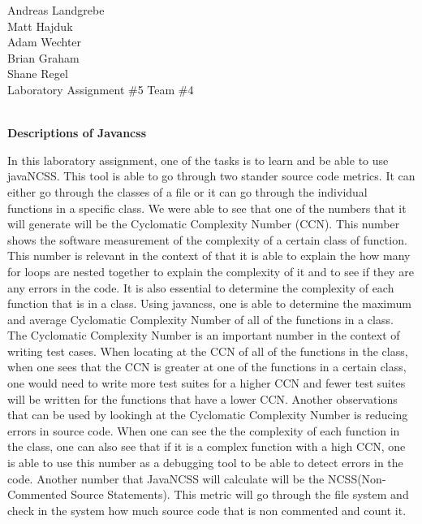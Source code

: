 \documentclass{article}
\begin{document}
\noindent
Andreas Landgrebe
\\
Matt Hajduk
\\
Adam Wechter
\\
Brian Graham
\\
Shane Regel
\\
Laboratory Assignment \#5 Team \#4 
\\
\\
\begin{center}
\textbf{Descriptions of Javancss}
\end{center}
In this laboratory assignment, one of the tasks is to learn and be able to use javaNCSS. This tool is able to go through two stander source code metrics. It can either go through the classes of a file or it can go through the individual functions in a specific class. We were able to see that one of the numbers that it will generate will be the Cyclomatic Complexity Number (CCN). This number shows the software measurement of the complexity of a certain class of function. This number is relevant in the context of that it is able to explain the how many for loops are nested together to explain the complexity of it and to see if they are any errors in the code. It is also essential to determine the complexity of each function that is in a class. Using javancss, one is able to determine the maximum and average Cyclomatic Complexity Number of all of the functions in a class. The Cyclomatic Complexity Number is an important number in the context of writing test cases. When locating at the CCN of all of the functions in the class, when one sees that the CCN is greater at one of the functions in a certain class, one would need to write more test suites for a higher CCN and fewer test suites will be written for the functions that have a lower CCN. Another observations that can be used by lookingh at the Cyclomatic Complexity Number is reducing errors in source code. When one can see the the complexity of each function in the class, one can also see that if it is a complex function with a high CCN, one is able to use this number as a debugging tool to be able to detect errors in the code. Another number that JavaNCSS will calculate will be the NCSS(Non-Commented Source Statements). This metric will go through the file system and check in the system how much source code that is non commented and count it.      
\end{document}
